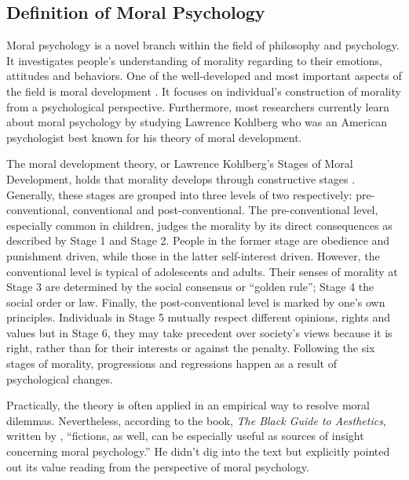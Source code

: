 \subsection{Definition of Moral Psychology} %
\label{sub:definition_of_moral_psychology}
\begin{text}

Moral psychology is a novel branch within the field of philosophy and psychology. It investigates people's understanding of morality regarding to their emotions, attitudes and behaviors. One of the well-developed and most important aspects of the field is moral development . It focuses on individual's construction of morality from a psychological perspective. Furthermore, most researchers currently learn about moral psychology by studying Lawrence Kohlberg who was an American psychologist best known for his theory of moral development.

The moral development theory, or Lawrence Kohlberg's Stages of Moral Development, holds that morality develops through constructive stages \citep{kohlberg1958development}. Generally, these stages are grouped into three levels of two respectively: pre-conventional, conventional and post-conventional. The pre-conventional level, especially common in children, judges the morality by its direct consequences as described by Stage 1 and Stage 2. People in the former stage are obedience and punishment driven, while those in the latter self-interest driven. However, the conventional level is typical of adolescents and adults. Their senses of morality at Stage 3 are determined by the social consensus or ``golden rule''; Stage 4 the social order or law. Finally, the post-conventional level is marked by one's own principles. Individuals in Stage 5 mutually respect different opinions, rights and values but in Stage 6, they may take precedent over society's views because it is right, rather than for their interests or against the penalty. Following the six stages of morality, progressions and regressions happen as a result of psychological changes.

Practically, the theory is often applied in an empirical way to resolve moral dilemmas. Nevertheless, according to the book, \textit{The Black Guide to Aesthetics}, written by \citet{kivy2009blackwell}, ``fictions, as well, can be especially useful as sources of insight concerning moral psychology.'' He didn't dig into the text but explicitly pointed out its value reading from the perspective of moral psychology.

\end{text}
